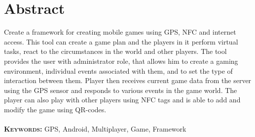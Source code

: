 \chapter{Abstract}
Create a framework for creating mobile games using GPS, NFC and internet access. This tool can create a game plan and the players in it perform virtual tasks, react to the circumstances in the world and other players. The tool provides the user with administrator role, that allows him to create a gaming environment, individual events associated with them, and to set the type of interaction between them. Player then receives current game data from the server using the GPS sensor and responds to various events in the game world. The player can also play with other players using NFC tags and is able to add and modify the game using QR-codes.\\ \\
\textbf{\textsc{Keywords:}} GPS, Android, Multiplayer, Game, Framework



